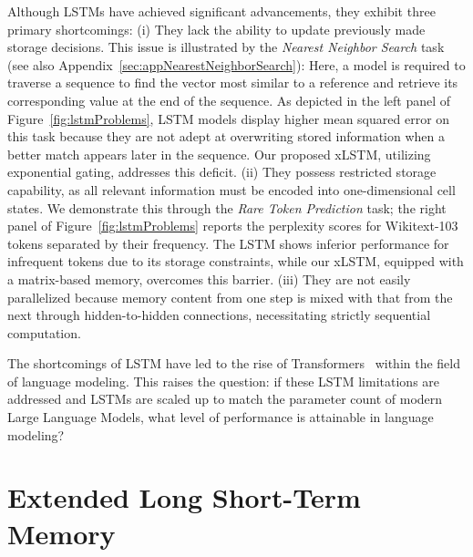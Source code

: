 Although LSTMs have achieved significant advancements, they exhibit three primary shortcomings: (i) They lack the ability to update previously made storage decisions. This issue is illustrated by the {\it Nearest Neighbor Search} task (see also Appendix~\ref{sec:appNearestNeighborSearch}): Here, a model is required to traverse a sequence to find the vector most similar to a reference and retrieve its corresponding value at the end of the sequence. As depicted in the left panel of Figure~\ref{fig:lstmProblems}, LSTM models display higher mean squared error on this task because they are not adept at overwriting stored information when a better match appears later in the sequence. Our proposed xLSTM, utilizing exponential gating, addresses this deficit. (ii) They possess restricted storage capability, as all relevant information must be encoded into one-dimensional cell states. We demonstrate this through the {\it Rare Token Prediction} task; the right panel of Figure~\ref{fig:lstmProblems} reports the perplexity scores for Wikitext-103~\citep{Merity:17} tokens separated by their frequency. The LSTM shows inferior performance for infrequent tokens due to its storage constraints, while our xLSTM, equipped with a matrix-based memory, overcomes this barrier. (iii) They are not easily parallelized because memory content from one step is mixed with that from the next through hidden-to-hidden connections, necessitating strictly sequential computation.

The shortcomings of LSTM have led to the rise of Transformers~\citep{Vaswani:17} within the field of language modeling. This raises the question: if these LSTM limitations are addressed and LSTMs are scaled up to match the parameter count of modern Large Language Models, what level of performance is attainable in language modeling?

\section{Extended Long Short-Term Memory}
\label{sec:xLSTM}

